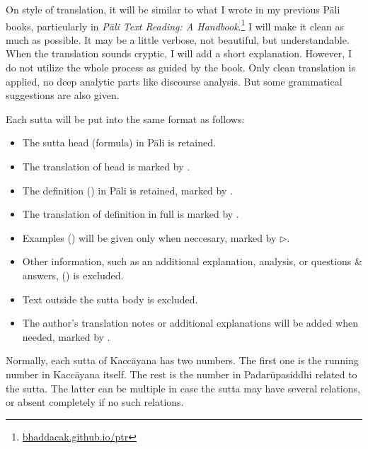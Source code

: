 On style of translation, it will be similar to what I wrote in my previous Pāli books, particularly in \emph{Pāli Text Reading: A Handbook}.\footnote{\url{bhaddacak.github.io/ptr}} I will make it clean as much as possible. It may be a little verbose, not beautiful, but understandable. When the translation sounds cryptic, I will add a short explanation. However, I do not utilize the whole process as guided by the book. Only clean translation is applied, no deep analytic parts like discourse analysis. But some grammatical suggestions are also given.

Each sutta will be put into the same format as follows:

\begin{itemize}
\item The sutta head (formula) in Pāli is retained.
\item The translation of head is marked by \faHeart[regular].
\item The definition () in Pāli is retained, marked by \faAngleRight.
\item The translation of definition in full is marked by \faAngleDoubleRight.
\item Examples () will be given only when neccesary, marked by $\triangleright$.
\item Other information, such as an additional explanation, analysis, or questions \& answers, () is excluded.
\item Text outside the sutta body is excluded.
\item The author's translation notes or additional explanations will be added when needed, marked by \faLightbulb[regular].
\end{itemize}

Normally, each sutta of Kaccāyana has two numbers. The first one is the running number in Kaccāyana itself. The rest is the number in Padarūpasiddhi related to the sutta. The latter can be multiple in case the sutta may have several relations, or absent completely if no such relations.
